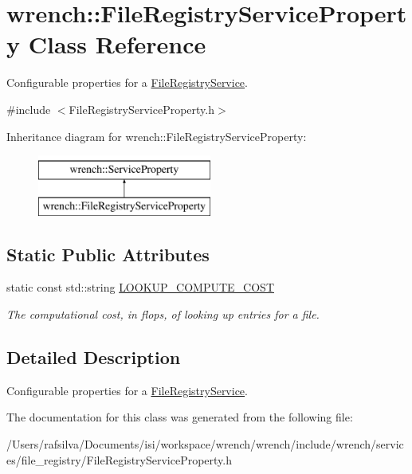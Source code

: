\hypertarget{classwrench_1_1_file_registry_service_property}{}\section{wrench\+:\+:File\+Registry\+Service\+Property Class Reference}
\label{classwrench_1_1_file_registry_service_property}


Configurable properties for a \hyperlink{classwrench_1_1_file_registry_service}{File\+Registry\+Service}.  




{\ttfamily \#include $<$File\+Registry\+Service\+Property.\+h$>$}

Inheritance diagram for wrench\+:\+:File\+Registry\+Service\+Property\+:\begin{figure}[H]
\begin{center}
\leavevmode
\includegraphics[height=2.000000cm]{classwrench_1_1_file_registry_service_property}
\end{center}
\end{figure}
\subsection*{Static Public Attributes}
\begin{DoxyCompactItemize}
\item 
\mbox{\label{classwrench_1_1_file_registry_service_property_abd5bce0e04fa204f45aaaec00438eae7}} 
static const std\+::string \hyperlink{classwrench_1_1_file_registry_service_property_abd5bce0e04fa204f45aaaec00438eae7}{L\+O\+O\+K\+U\+P\+\_\+\+C\+O\+M\+P\+U\+T\+E\+\_\+\+C\+O\+ST}
\begin{DoxyCompactList}\small\item\em The computational cost, in flops, of looking up entries for a file. \end{DoxyCompactList}\end{DoxyCompactItemize}


\subsection{Detailed Description}
Configurable properties for a \hyperlink{classwrench_1_1_file_registry_service}{File\+Registry\+Service}. 

The documentation for this class was generated from the following file\+:\begin{DoxyCompactItemize}
\item 
/\+Users/rafsilva/\+Documents/isi/workspace/wrench/wrench/include/wrench/services/file\+\_\+registry/File\+Registry\+Service\+Property.\+h\end{DoxyCompactItemize}
